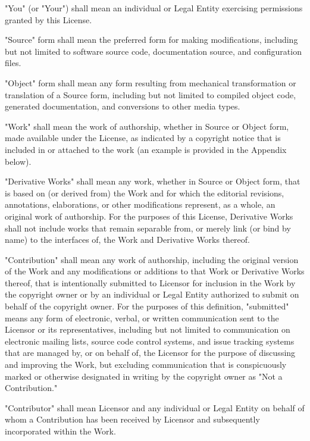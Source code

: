 \documentclass[a4paper,twoside]{tceusermanual}
\begin{document}
      "You" (or "Your") shall mean an individual or Legal Entity
      exercising permissions granted by this License.

      "Source" form shall mean the preferred form for making modifications,
      including but not limited to software source code, documentation
      source, and configuration files.

      "Object" form shall mean any form resulting from mechanical
      transformation or translation of a Source form, including but
      not limited to compiled object code, generated documentation,
      and conversions to other media types.

      "Work" shall mean the work of authorship, whether in Source or
      Object form, made available under the License, as indicated by a
      copyright notice that is included in or attached to the work
      (an example is provided in the Appendix below).

      "Derivative Works" shall mean any work, whether in Source or Object
      form, that is based on (or derived from) the Work and for which the
      editorial revisions, annotations, elaborations, or other modifications
      represent, as a whole, an original work of authorship. For the purposes
      of this License, Derivative Works shall not include works that remain
      separable from, or merely link (or bind by name) to the interfaces of,
      the Work and Derivative Works thereof.

      "Contribution" shall mean any work of authorship, including
      the original version of the Work and any modifications or additions
      to that Work or Derivative Works thereof, that is intentionally
      submitted to Licensor for inclusion in the Work by the copyright owner
      or by an individual or Legal Entity authorized to submit on behalf of
      the copyright owner. For the purposes of this definition, "submitted"
      means any form of electronic, verbal, or written communication sent
      to the Licensor or its representatives, including but not limited to
      communication on electronic mailing lists, source code control systems,
      and issue tracking systems that are managed by, or on behalf of, the
      Licensor for the purpose of discussing and improving the Work, but
      excluding communication that is conspicuously marked or otherwise
      designated in writing by the copyright owner as "Not a Contribution."

      "Contributor" shall mean Licensor and any individual or Legal Entity
      on behalf of whom a Contribution has been received by Licensor and
      subsequently incorporated within the Work.
\end{document}
